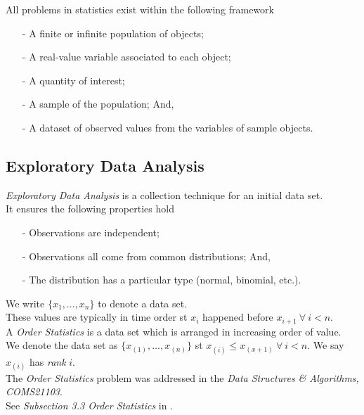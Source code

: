 \documentclass[11pt,a4paper]{article}
\begin{document}
All problems in statistics exist within the following framework
\begin{itemize}
	\item[-] A finite or infinite population of objects;
	\item[-] A real-value variable associated to each object;
	\item[-] A quantity of interest;
	\item[-] A sample of the population; And,
	\item[-] A dataset of observed values from the variables of sample objects.
\end{itemize}

\subsection{Exploratory Data Analysis}

\textit{Exploratory Data Analysis} is a collection technique for an initial data set.\\
It ensures the following properties hold
\begin{itemize}
	\item[-] Observations are independent;
	\item[-] Observations all come from common distributions; And,
	\item[-] The distribution has a particular type (normal, binomial, etc.).
\end{itemize}

We write $\{x_1,\dots,x_n\}$ to denote a data set.\\
These values are typically in time order st $x_i$ happened before $x_{i+1}\ \forall\ i<n$.\\

A \textit{Order Statistics} is a data set which is arranged in increasing order of value.\\
We denote the data set as $\{x_{(1)},\dots,x_{(n)}\}$ st $x_{(i)}\leq x_{(x+1)}\ \forall\ i<n$.
\nb We say $x_{(i)}$ has \textit{rank} $i$.\\

The \textit{Order Statistics} problem was addressed in the \textit{Data Structures \& Algorithms, COMS21103}.\\
See \textit{Subsection 3.3 Order Statistics} in {}.\\
\end{document}
